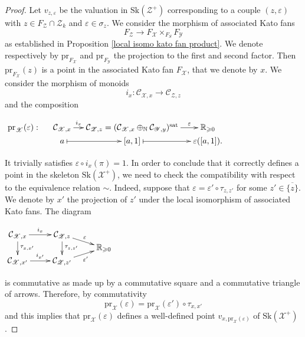 \documentclass{amsart}%
\numberwithin{equation}{subsection}
\theoremstyle{plain2}
\theoremstyle{definition2}
\theoremstyle{stepstyle}
\theoremstyle{point}
\theoremstyle{subpoint}
\newcommand{\N}{\ensuremath{\mathbb{N}}}
\newcommand{\R}{\ensuremath{\mathbb{R}}}
\newcommand{\cX}{\ensuremath{\mathscr{X}}}
\newcommand{\caC}{\ensuremath{\mathcal{C}}}
\newcommand{\cY}{\ensuremath{\mathscr{Y}}}
\newcommand{\cZ}{\ensuremath{\mathscr{Z}}}
\renewcommand{\R}{\ensuremath{\mathbb{R}}}
\renewcommand{\cY}{\ensuremath{\mathscr{Y}}}
\newcommand{\pr}{\mathrm{pr}}
\newcommand{\Sk}{\mathrm{Sk}}
\begin{document}
\begin{proof}
Let $v_{z,\varepsilon}$ be the valuation in $\Sk(\cZ^+)$ corresponding to a couple $(z,\varepsilon)$ with $z \in F_{\cZ} \cap \cZ_k$ and $\varepsilon \in \sigma_z$. We consider the morphism of associated Kato fans $$F_{\cZ} \rightarrow F_{\cX} \times_{F_S} F_{\cY}$$ as established in Proposition \ref{local isomo kato fan product}. We denote respectively by $\pr_{F_\cX}$ and $\pr_{F_\cY}$ the projection to the first and second factor. Then $\pr_{F_{\cX}}(z)$ is a point in the associated Kato fan $F_{\cX}$, that we denote by $x$. We consider the morphism of monoids $$i_x: \caC_{\cX,x} \rightarrow \caC_{\cZ,z}$$ and the composition \begin{center}
$\begin{gathered}
\xymatrixcolsep{1pc} \xymatrixrowsep{0pc} \xymatrix{
    \pr_{\cX}(\varepsilon): & \caC_{\cX,x} \ar[r]^-{i_x} & \caC_{\cZ,z}= (\caC_{\cX,x} \oplus_{\N} \caC_{\cY,y})^{\text{sat}} \ar[r]^-{\varepsilon} & \R_{\geqslant 0} \\
   & a \ar@{|->}[r] & [a,1] \ar@{|->}[r] & \varepsilon([a,1]). \\
}
\end{gathered}$\end{center} It trivially satisfies $\varepsilon \circ i_x(\pi)=1$. In order to conclude that it correctly defines a point in the skeleton $\Sk(\cX^+)$, we need to check the compatibility with respect to the equivalence relation $\sim$. Indeed, suppose that $\varepsilon = \varepsilon' \circ \tau_{z,z'}$ for some $z' \in \overline{\{z\}}$. We denote by $x'$ the projection of $z'$ under the local isomorphism of associated Kato fans. The diagram
\begin{center}
$\begin{gathered}
\xymatrixcolsep{2pc} \xymatrixrowsep{0pc} \xymatrix{
    \caC_{\cX,x} \ar[r]^-{i_x} \ar[dd]^{\tau_{x,x'}} & \caC_{\cZ,z} \ar[rd]^-{\varepsilon} \ar[dd]^{\tau_{z,z'}} & \\
    & & \R_{\geqslant 0} \\
    \caC_{\cX,x'} \ar[r]^-{i_{x'}} & \caC_{\cZ,z'} \ar[ru]_-{\varepsilon'} &  \\
}
\end{gathered}$\end{center} is commutative as made up by a commutative square and a commutative triangle of arrows. Therefore, by commutativity $$\pr_{\cX}(\varepsilon)= \pr_{\cX}(\varepsilon') \circ \tau_{x,x'}$$ and this implies that $\pr_{\cX}(\varepsilon)$ defines a well-defined point $v_{x,\pr_{\cX}(\varepsilon)}$ of $\Sk(\cX^+)$.


\end{proof}
\end{document}
